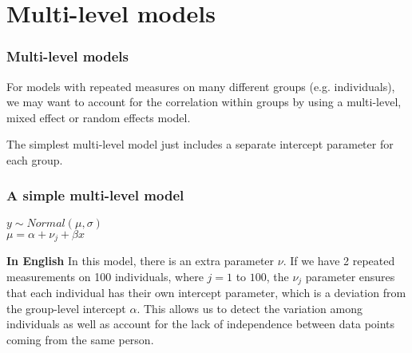 \documentclass{beamer}
\begin{document}
\section{Multi-level models}
\begin{frame}
  \frametitle{Multi-level models}
  For models with repeated measures on many different groups (e.g. individuals), we may want to account for the correlation within groups by using a \alert{multi-level}, \alert{mixed effect} or \alert{random effects} model. \\ \vspace{0.5cm}

  The simplest multi-level model just includes a separate intercept parameter for each group.
\end{frame}
\begin{frame}
  \frametitle{A simple multi-level model}
  \begin{centering}
    $y \sim Normal(\mu, \sigma)$ \\ \vspace{0.5cm}
    $\mu = \alpha + \nu_j + \beta x$ \\
  \end{centering} \vspace{1cm}
  \begin{block}{\textbf{In English}}
  In this model, there is an extra parameter $\nu$. If we have 2 repeated measurements on 100 individuals, where $j = 1$ to $100$, the $\nu_j$ parameter ensures that each individual has their own intercept parameter, which is a deviation from the group-level intercept $\alpha$. This allows us to detect the variation among individuals as well as account for the lack of independence between data points coming from the same person.
  \end{block}
\end{frame}
\end{document}
